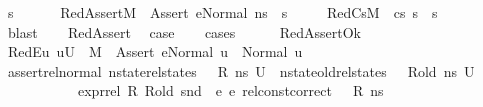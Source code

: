 \begin{isabellebody}
\ s{\isacharprime}{\kern0pt}{\isacharprime}{\kern0pt}\ \ \isanewline
\ \ \ \ RedAssert{\isacharcolon}{\kern0pt}{\isachardoublequoteopen}M{\isacharcomma}{\kern0pt}{\isasymLambda}{\isacharcomma}{\kern0pt}{\isasymGamma}{\isacharcomma}{\kern0pt}{\isasymOmega}\ {\isasymturnstile}\ {\isasymlangle}Assert\ e{}{\isacharcomma}{\kern0pt}Normal\ ns{\isasymrangle}\ {\isasymrightarrow}\ s{\isacharprime}{\kern0pt}{\isacharprime}{\kern0pt}{\isachardoublequoteclose}\ \isanewline
\ \ \ \ RedCs{}{\isacharcolon}{\kern0pt}{\isachardoublequoteopen}M{\isacharcomma}{\kern0pt}{\isasymLambda}{\isacharcomma}{\kern0pt}{\isasymGamma}{\isacharcomma}{\kern0pt}{\isasymOmega}\ {\isasymturnstile}\ {\isasymlangle}cs{}{\isacharcomma}{\kern0pt}\ s{\isacharprime}{\kern0pt}{\isacharprime}{\kern0pt}{\isasymrangle}\ {\isacharbrackleft}{\kern0pt}{\isasymrightarrow}{\isacharbrackright}{\kern0pt}\ s{\isacharprime}{\kern0pt}{\isachardoublequoteclose}\ \isanewline
\ \ \ \ \isamarkupfalse%
\ blast\isanewline
\ \ \isamarkupfalse%
\ RedAssert\ \isamarkupfalse%
\ {\isacharquery}{\kern0pt}case\isanewline
\ \ \isamarkupfalse%
\ cases\isanewline
\ \ \ \ \isamarkupfalse%
\ RedAssertOk\isanewline
\ \ \ \ \isamarkupfalse%
\ RedE{}{\isacharcolon}{\kern0pt}{\isachardoublequoteopen}{\isasymAnd}u{\isachardot}{\kern0pt}\ u{\isasymin}U{}\ {\isasymLongrightarrow}\ M{\isacharcomma}{\kern0pt}{\isasymLambda}{\isacharprime}{\kern0pt}{\isacharcomma}{\kern0pt}{\isasymGamma}{\isacharcomma}{\kern0pt}{\isasymOmega}\ {\isasymturnstile}\ {\isasymlangle}Assert\ e{}{\isacharcomma}{\kern0pt}Normal\ u{\isasymrangle}\ {\isasymrightarrow}\ Normal\ u{\isachardoublequoteclose}\isanewline
\ \ \ \ \ \ \isamarkupfalse%
\ assert{\isacharunderscore}{\kern0pt}rel{\isacharunderscore}{\kern0pt}normal{\isacharunderscore}{\kern0pt}{}\ {\isacartoucheopen}nstate{\isacharunderscore}{\kern0pt}rel{\isacharunderscore}{\kern0pt}states\ {\isasymLambda}\ {\isasymLambda}{\isacharprime}{\kern0pt}\ R\ ns\ U{}{\isacartoucheclose}\ \ {\isacartoucheopen}nstate{\isacharunderscore}{\kern0pt}old{\isacharunderscore}{\kern0pt}rel{\isacharunderscore}{\kern0pt}states\ {\isasymLambda}\ {\isasymLambda}{\isacharprime}{\kern0pt}\ R{\isacharunderscore}{\kern0pt}old\ ns\ U{}{\isacartoucheclose}\ \isanewline
\ \ \ \ \ \ \ \ \ \ \ {\isacartoucheopen}expr{\isacharunderscore}{\kern0pt}rel\ R\ R{\isacharunderscore}{\kern0pt}old\ {\isacharparenleft}{\kern0pt}snd\ {\isasymLambda}{\isacharparenright}{\kern0pt}\ e{}\ e{}{\isacartoucheclose}\ {\isacartoucheopen}rel{\isacharunderscore}{\kern0pt}const{\isacharunderscore}{\kern0pt}correct\ {\isasymLambda}\ {\isasymOmega}\ R\ ns{\isacartoucheclose}\ \isamarkupfalse%

\end{isabellebody}

